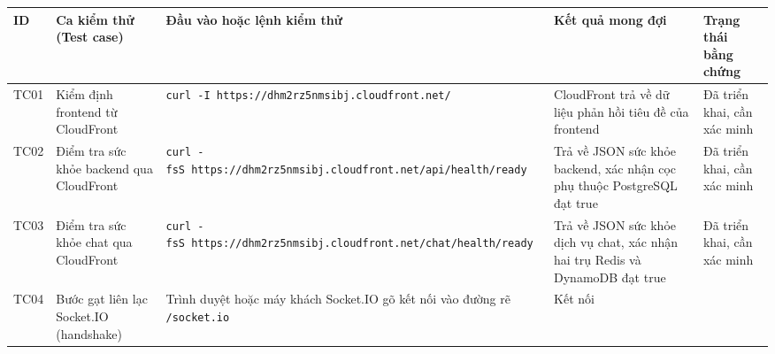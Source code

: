 {
\begingroup
\small
\setlength{\tabcolsep}{3pt}
\renewcommand{\arraystretch}{1.15}
\begin{longtable}{@{}
  >{\raggedright\arraybackslash}p{}
  >{\raggedright\arraybackslash}p{}
  >{\raggedright\arraybackslash}p{}
  >{\raggedright\arraybackslash}p{}
  >{\raggedright\arraybackslash}p{}@{}}
\toprule\noalign{}
\begin{minipage}[b]{\linewidth}\raggedright
ID
\end{minipage} & \begin{minipage}[b]{\linewidth}\raggedright
Ca kiểm thử (Test case)
\end{minipage} & \begin{minipage}[b]{\linewidth}\raggedright
Đầu vào hoặc lệnh kiểm thử
\end{minipage} & \begin{minipage}[b]{\linewidth}\raggedright
Kết quả mong đợi
\end{minipage} & \begin{minipage}[b]{\linewidth}\raggedright
Trạng thái bằng chứng
\end{minipage} \\
\midrule\noalign{}
\endhead
\bottomrule\noalign{}
\endlastfoot
TC01 & Kiểm định frontend từ CloudFront &
\texttt{curl\ -I\ https:/\allowbreak{}/\allowbreak{}dhm2rz5nmsibj.\allowbreak{}cloudfront.\allowbreak{}net/\allowbreak{}} & CloudFront
trả về dữ liệu phản hồi tiêu đề của frontend & Đã triển khai, cần xác
minh \\
TC02 & Điểm tra sức khỏe backend qua CloudFront &
\texttt{curl\ -fsS\ https:/\allowbreak{}/\allowbreak{}dhm2rz5nmsibj.\allowbreak{}cloudfront.\allowbreak{}net/\allowbreak{}api/\allowbreak{}health/\allowbreak{}ready}
& Trả về JSON sức khỏe backend, xác nhận cọc phụ thuộc PostgreSQL đạt
true & Đã triển khai, cần xác minh \\
TC03 & Điểm tra sức khỏe chat qua CloudFront &
\texttt{curl\ -fsS\ https:/\allowbreak{}/\allowbreak{}dhm2rz5nmsibj.\allowbreak{}cloudfront.\allowbreak{}net/\allowbreak{}chat/\allowbreak{}health/\allowbreak{}ready}
& Trả về JSON sức khỏe dịch vụ chat, xác nhận hai trụ Redis và DynamoDB
đạt true & Đã triển khai, cần xác minh \\
TC04 & Bước gạt liên lạc Socket.IO (handshake) & Trình duyệt hoặc máy
khách Socket.IO gõ kết nối vào đường rẽ \texttt{/\allowbreak{}socket.\allowbreak{}io} & Kết nối

\end{longtable}}
